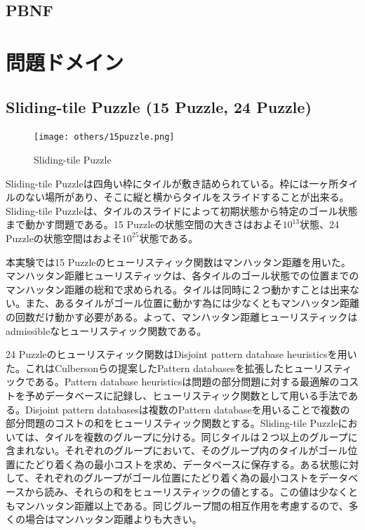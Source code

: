 \documentclass{jsarticle}
\begin{document}
\subsection{PBNF}



\section{問題ドメイン}
\subsection{Sliding-tile Puzzle (15 Puzzle, 24 Puzzle)}

\begin{figure}
	\centering
	\texttt{[image: others/15puzzle.png]}
	\label{fig:15puzzle}
	\caption{Sliding-tile Puzzle}
\end{figure}%

Sliding-tile Puzzleは四角い枠にタイルが敷き詰められている。枠には一ヶ所タイルのない場所があり、そこに縦と横からタイルをスライドすることが出来る。Sliding-tile Puzzleは、タイルのスライドによって初期状態から特定のゴール状態まで動かす問題である。15 Puzzleの状態空間の大きさはおよそ$10^{13}$状態、24 Puzzleの状態空間はおよそ$10^{25}$状態である。

本実験では15 Puzzleのヒューリスティック関数はマンハッタン距離を用いた。マンハッタン距離ヒューリスティックは、各タイルのゴール状態での位置までのマンハッタン距離の総和で求められる。タイルは同時に２つ動かすことは出来ない。また、あるタイルがゴール位置に動かす為には少なくともマンハッタン距離の回数だけ動かす必要がある。よって、マンハッタン距離ヒューリスティックはadmissibleなヒューリスティック関数である。

24 Puzzleのヒューリスティック関数はDisjoint pattern database heuristicsを用いた\cite{Korf2002}。これはCulbersonらの提案したPattern databasesを拡張したヒューリスティックである。Pattern database heuristicsは問題の部分問題に対する最適解のコストを予めデータベースに記録し、ヒューリスティック関数として用いる手法である\cite{culberson1998pattern}。Disjoint pattern databasesは複数のPattern databaseを用いることで複数の部分問題のコストの和をヒューリスティック関数とする。Sliding-tile Puzzleにおいては、タイルを複数のグループに分ける。同じタイルは２つ以上のグループに含まれない。それぞれのグループにおいて、そのグループ内のタイルがゴール位置にたどり着く為の最小コストを求め、データベースに保存する。ある状態に対して、それぞれのグループがゴール位置にたどり着く為の最小コストをデータベースから読み、それらの和をヒューリスティックの値とする。この値は少なくともマンハッタン距離以上である。同じグループ間の相互作用を考慮するので、多くの場合はマンハッタン距離よりも大きい。
\end{document}
